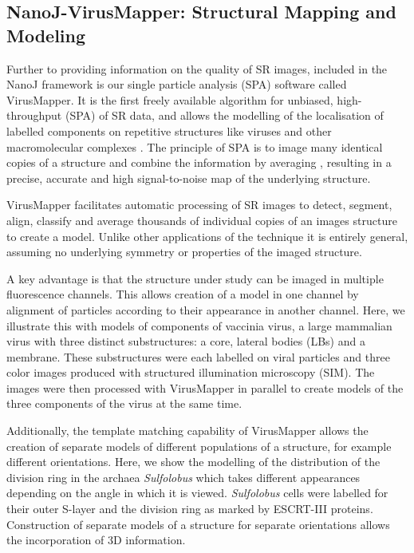 \subsection*{NanoJ-VirusMapper: Structural Mapping and Modeling}
Further to providing information on the quality of SR images, included in the NanoJ framework is our single particle analysis (SPA) software called VirusMapper. It is the first freely available algorithm for unbiased, high-throughput (SPA) of SR data, and allows the modelling of the localisation of labelled components on repetitive structures like viruses and other macromolecular complexes \cite{Gray2016,Gray2017}. The principle of SPA is to image many identical copies of a structure and combine the information by averaging \cite{Szymborska2013,laine2015structural}, resulting in a precise, accurate and high signal-to-noise map of the underlying structure. 

VirusMapper facilitates automatic processing of SR images to detect, segment, align, classify and average thousands of individual copies of an images structure to create a model. Unlike other applications of the technique it is entirely general, assuming no underlying symmetry or properties of the imaged structure. 

A key advantage is that the structure under study can be imaged in multiple fluorescence channels. This allows creation of a model in one channel by alignment of particles according to their appearance in another channel. Here, we illustrate this with models of components of vaccinia virus, a large mammalian virus with three distinct substructures: a core, lateral bodies (LBs) and a membrane. These substructures were each labelled on viral particles and three color images produced with structured illumination microscopy (SIM). The images were then processed with VirusMapper in parallel to create models of the three components of the virus at the same time.

Additionally, the template matching capability of VirusMapper allows the creation of separate models of different populations of a structure, for example different orientations. Here, we show the modelling of the distribution of the division ring in the archaea \emph{Sulfolobus} which takes different appearances depending on the angle in which it is viewed. \emph{Sulfolobus} cells were labelled for their outer S-layer and the division ring as marked by ESCRT-III proteins. Construction of separate models of a structure for separate orientations allows the incorporation of 3D information.

